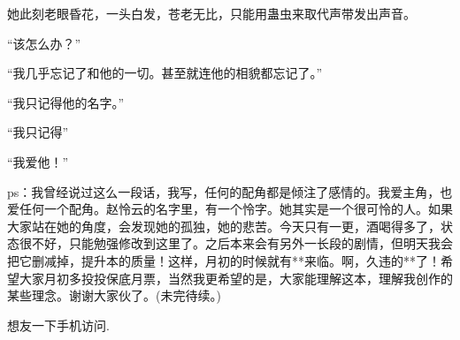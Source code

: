 \begin{this_body}
她此刻老眼昏花，一头白发，苍老无比，只能用蛊虫来取代声带发出声音。

“该怎么办？”

“我几乎忘记了和他的一切。甚至就连他的相貌都忘记了。”

“我只记得他的名字。”

“我只记得”

“我爱他！”

ps：我曾经说过这么一段话，我写，任何的配角都是倾注了感情的。我爱主角，也爱任何一个配角。赵怜云的名字里，有一个怜字。她其实是一个很可怜的人。如果大家站在她的角度，会发现她的孤独，她的悲苦。今天只有一更，酒喝得多了，状态很不好，只能勉强修改到这里了。之后本来会有另外一长段的剧情，但明天我会把它删减掉，提升本的质量！这样，月初的时候就有**来临。啊，久违的**了！希望大家月初多投投保底月票，当然我更希望的是，大家能理解这本，理解我创作的某些理念。谢谢大家伙了。(未完待续。)

想友一下手机访问.

\end{this_body}

